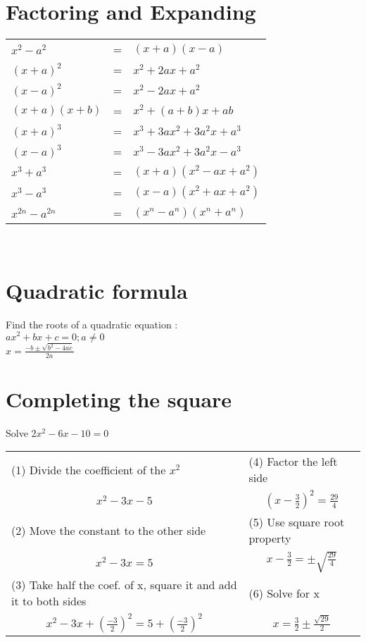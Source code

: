 \documentclass[10pt,onecolumn]{article}
\begin{document}
{%
\section{Factoring and Expanding}
\begin{tabular}{l l l}
\(x^2 - a^2 \) & = & \( (x+a)(x-a)\) \\
\((x+a)^2 \) & = & \( x^2 + 2ax + a^2 \) \\
\((x-a)^2 \) & = & \( x^2 - 2ax + a^2 \) \\
\((x+a)(x+b) \) & = & \( x^2 + (a+b)x + ab \) \\
\((x+a)^3 \) & = & \( x^3 + 3ax^2 + 3a^{2}x + a^3\) \\
\((x-a)^3 \) & = & \( x^3 - 3ax^2 + 3a^{2}x - a^3\) \\
\(x^3 + a^3 \) & = & \( (x+a)(x^2 - ax + a^2)\) \\
\(x^3 - a^3 \) & = & \( (x-a)(x^2 + ax + a^2)\) \\
\(x^{2n} - a^{2n} \) & = & \( (x^n - a^n)(x^n + a^n)\) \\
\end{tabular}}\\

\section{Quadratic formula}
Find the roots of a quadratic equation : \\
\( ax^2 + bx + c = 0; a \neq 0 \) \\
\( x = \frac{-b \pm \sqrt{b^2 - 4ac}}{2a} \)

\section{Completing the square}
\begin{center}
Solve \(2x^2 - 6x - 10 = 0 \) \\
{\renewcommand{\arraystretch}{2}
\begin{tabular}{l l}
(1) Divide the coefficient of the \(x^2\) & (4) Factor the left side \\
\multicolumn{1}{c}{\(x^2 -3x - 5\)} & \multicolumn{1}{c}{\((x - \frac{3}{2})^2 = \frac{29}{4}\)} \\
(2) Move the constant to the other side & (5) Use square root property \\
\multicolumn{1}{c}{\(x^2 - 3x = 5\)} & \multicolumn{1}{c}{\(x - \frac{3}{2} = \pm \sqrt{\frac{29}{4}}\)} \\
(3) Take half the coef. of x, square it and add it to both sides & (6) Solve for x \\
\multicolumn{1}{c}{\(x^2 - 3x + (\frac{-3}{2})^2 = 5 + (\frac{-3}{2})^2 \)} & \multicolumn{1}{c}{\(x = \frac{3}{2} \pm \frac{\sqrt{29}}{2}\)} 
\end{tabular}}
\end{center}
\pagebreak
\end{document}
